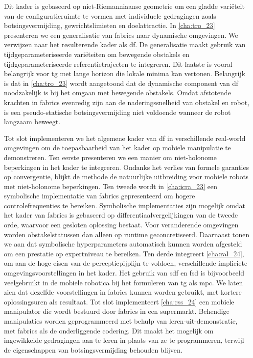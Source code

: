 Dit kader is gebaseerd op niet-Riemanniaanse geometrie om een gladde variëteit
van de configuratieruimte te vormen met individuele gedragingen zoals
botsingsvermijding, gewrichtslimieten en doelattractie. In \cref{cha:tro_23}
presenteren we een generalisatie van \ac{fabrics} naar dynamische omgevingen. We
verwijzen naar het resulterende kader als \ac{df}. De generalisatie maakt
gebruik van tijdgeparameteriseerde variëteiten om bewegende obstakels en
tijdgeparameteriseerde referentietrajecten te integreren. Dit laatste is vooral
belangrijk voor \ac{tg} met lange horizon die lokale minima kan vertonen.
Belangrijk is dat in \cref{cha:tro_23} wordt aangetoond dat de dynamische
component van \ac{df} noodzakelijk is bij het omgaan met bewegende obstakels.
Omdat afstotende krachten in \ac{fabrics} evenredig zijn aan de
naderingssnelheid van obstakel en robot, is een pseudo-statische
botsingsvermijding niet voldoende wanneer de robot langzaam beweegt.

Tot slot implementeren we het algemene kader van \ac{df} in verschillende
real-world omgevingen om de toepasbaarheid van het kader op mobiele manipulatie
te demonstreren. Ten eerste presenteren we een manier om niet-holonome
beperkingen in het kader te integreren. Ondanks het verlies van formele
garanties op convergentie, blijkt de methode de natuurlijke uitbreiding voor
mobiele robots met niet-holonome beperkingen. Ten tweede wordt in
\cref{cha:icra_23} een symbolische implementatie van \ac{fabrics} gepresenteerd
om hogere controlefrequenties te bereiken. Symbolische implementaties zijn
mogelijk omdat het kader van \ac{fabrics} is gebaseerd op
differentiaalvergelijkingen van de tweede orde, waarvoor een gesloten oplossing
bestaat. Voor veranderende omgevingen worden obstakelstatussen dan alleen op
runtime geconcretiseerd. Daarnaast tonen we aan dat symbolische hyperparameters
automatisch kunnen worden afgesteld om een prestatie op expertniveau te
bereiken. Ten derde integreert \cref{cha:ral_24}, om aan de hoge eisen van de
perceptiepijplijn te voldoen, verschillende impliciete omgevingsvoorstellingen
in het kader. Het gebruik van \ac{sdf} en \ac{fsd} is bijvoorbeeld
veelgebruikt in de mobiele robotica bij het formuleren van \ac{tg} als \ac{mpc}.
We laten zien dat dezelfde voorstellingen in \ac{fabrics} kunnen worden
gebruikt, met kortere oplossingsuren als resultaat. Tot slot implementeert
\cref{cha:rss_24} een mobiele manipulator die wordt bestuurd door \ac{fabrics}
in een supermarkt. Behendige manipulaties worden geprogrammeerd met behulp van
leren-uit-demonstratie, met \ac{fabrics} als de onderliggende codering. Dit
maakt het mogelijk om ingewikkelde gedragingen aan te leren in plaats van ze te
programmeren, terwijl de eigenschappen van botsingsvermijding behouden blijven.

